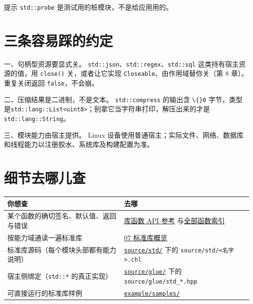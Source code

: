 \begin{tip}{提示}
\texttt{std:\allowbreak{}:\allowbreak{}probe} 是测试用的桩模块，不是给应用用的。
\end{tip}

\section{三条容易踩的约定}

一、句柄型资源要显式关。 \texttt{std:\allowbreak{}:\allowbreak{}json}、\texttt{std:\allowbreak{}:\allowbreak{}regex}、\texttt{std:\allowbreak{}:\allowbreak{}sql} 这类持有宿主资源的值，用 \texttt{close(\allowbreak{})\allowbreak{}} 关，或者让它实现 \texttt{Closeable}、由作用域替你关（第 8 章）。重复关闭返回 \texttt{false}，不会崩。

二、压缩结果是二进制，不是文本。 \texttt{std:\allowbreak{}:\allowbreak{}compress} 的输出含 \texttt{\textbackslash\{\}0} 字节，类型是\texttt{std:\allowbreak{}:\allowbreak{}lang:\allowbreak{}:\allowbreak{}List<\allowbreak{}uint8>\allowbreak{}}；别拿它当字符串打印，解压出来的才是 \texttt{std:\allowbreak{}:\allowbreak{}lang:\allowbreak{}:\allowbreak{}String}。

三、模块能力由宿主提供。 Linux 设备使用普通宿主；实际文件、网络、数据库和线程能力以注册胶水、系统库及构建配置为准。

\section{细节去哪儿查}

{\small\setlength{\tabcolsep}{4pt}
\begin{longtable}{>{\raggedright\arraybackslash}p{}>{\raggedright\arraybackslash}p{}}
\toprule
你想查 & 去哪 \\
\midrule
\endhead
某个函数的确切签名、默认值、返回与错误 & \href{https://gitee.com/rabbitc999/chali/blob/master/doc/library/README.md}{库函数 API 参考} 与\href{https://gitee.com/rabbitc999/chali/blob/master/doc/library/symbols.md}{全部函数索引} \\
按能力域通读一遍标准库 & \href{https://gitee.com/rabbitc999/chali/blob/master/doc/07-stdlib-overview.md}{07 标准库概览} \\
标准库源码（每个模块头部都有能力说明） & \href{https://gitee.com/rabbitc999/chali/tree/master/source/std}{\texttt{source/\allowbreak{}std/\allowbreak{}}} 下的 \texttt{source/\allowbreak{}std/\allowbreak{}<\allowbreak{}名字>\allowbreak{}.\allowbreak{}chl} \\
宿主侧绑定（\texttt{std:\allowbreak{}:\allowbreak{}*} 的真正实现） & \href{https://gitee.com/rabbitc999/chali/tree/master/source/glue}{\texttt{source/\allowbreak{}glue/\allowbreak{}}} 下的 \texttt{source/\allowbreak{}glue/\allowbreak{}std\_*.\allowbreak{}hpp} \\
可直接运行的标准库样例 & \href{https://gitee.com/rabbitc999/chali/tree/master/example/samples}{\texttt{example/\allowbreak{}samples/\allowbreak{}}} \\
\bottomrule
\end{longtable}
}

